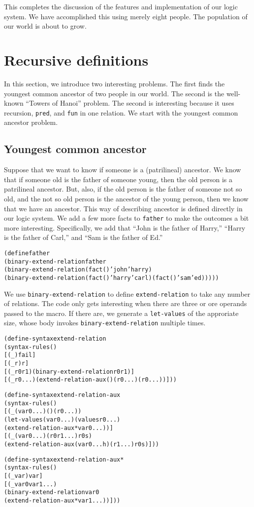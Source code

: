 This completes the discussion of the features and implementation of
our logic system.  We have accomplished this using merely eight
people.  The population of our world is about to grow.

\section{Recursive definitions}

In this section, we introduce two interesting problems.  The first
finds the youngest common ancestor of two people in our world.  The
second is the well-known ``Towers of Hanoi'' problem.  The second 
is interesting because it uses recursion, \texttt{pred}, and
\texttt{fun} in one relation.  We start with the youngest common
ancestor problem.

\subsection{Youngest common ancestor}

Suppose that we want to know if someone is a (patrilineal) ancestor.
We know that if someone old is the father of someone young, then the
old person is a patrilineal ancestor.  But, also, if the old person is
the father of someone not so old, and the not so old person is the
ancestor of the young person, then we know that we have an ancestor.
This way of describing ancestor is defined directly in our logic
system.  We add a few more facts to \texttt{father} to make the
outcomes a bit more interesting.  Specifically, we add that ``John is
the father of Harry,'' ``Harry is the father of Carl,'' and ``Sam is the
father of Ed.''

\begin{alltt}
(define father
  (binary-extend-relation father
    (binary-extend-relation (fact () 'john 'harry)
      (binary-extend-relation (fact () 'harry 'carl) (fact () 'sam 'ed)))))
\end{alltt}

We use \texttt{binary-extend-relation} to define
\texttt{extend-relation} to take any number of relations.
The code only gets interesting when there are three
or ore operands passed to the macro.  If there are, we generate
a \texttt{let-values} of the approriate size, whose body
invokes \texttt{binary-extend-relation} multiple times.

\begin{alltt}
(define-syntax extend-relation
  (syntax-rules ()
    [(_) fail]
    [(_ r) r]
    [(_ r0 r1) (binary-extend-relation r0 r1)]
    [(_ r0 ...) (extend-relation-aux () (r0 ...) (r0 ...))]))

(define-syntax extend-relation-aux
  (syntax-rules ()
    [(_ (var0 ...) () (r0 ...))
     (let-values (var0 ...) (values r0 ...)
       (extend-relation-aux* var0 ...))]
    [(_ (var0 ...) (r0 r1 ...) r0s)
     (extend-relation-aux (var0 ... h) (r1 ...) r0s)]))

(define-syntax extend-relation-aux*
  (syntax-rules ()
    [(_ var) var]
    [(_ var0 var1 ...)
     (binary-extend-relation var0
       (extend-relation-aux* var1 ...))]))
\end{alltt}

